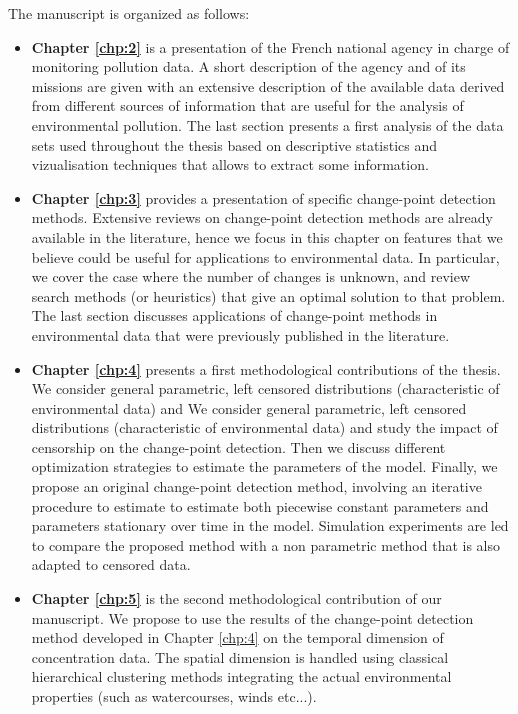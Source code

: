 The manuscript is organized as follows:
\begin{itemize}
\item{\textbf{Chapter \ref{chp:2}}} is a presentation of the French national agency in charge of monitoring pollution data. A short description of the agency and of its missions are given with an extensive description of the available data derived from different sources of information that are useful for the analysis of environmental pollution. The last section presents a first analysis of the data sets used throughout the thesis based on descriptive statistics and vizualisation techniques that allows to extract some information.
\item{\textbf{Chapter \ref{chp:3}}} provides a presentation of specific change-point detection methods. Extensive reviews on change-point detection  methods  are already  available in the literature,  hence we  focus  in this chapter on  features  that  we believe could  be  useful  for applications  to  environmental  data. In particular, we cover the case where the number of changes is unknown, and review search methods (or heuristics) that give an optimal solution to that problem. The last section discusses applications of change-point methods in environmental data that were previously published in the literature.
\item{\textbf{Chapter \ref{chp:4}}} presents a first methodological contributions of the thesis. 
We consider general parametric, left censored distributions (characteristic of environmental data) and We consider general parametric, left censored distributions (characteristic of environmental data) and study the impact of censorship on the change-point detection.  Then we discuss different optimization strategies to estimate the parameters of the model. Finally, we propose an original change-point detection method, involving an iterative procedure to estimate to estimate both piecewise constant parameters and parameters stationary over time in the model.  Simulation experiments are led to compare the proposed method with a non parametric method that is also adapted to censored data. 
\item{\textbf{Chapter \ref{chp:5}}} is the second methodological contribution of our manuscript. We propose to use the results of the change-point detection method developed in Chapter \ref{chp:4} on the temporal dimension of concentration data. The spatial dimension is handled using classical hierarchical clustering methods integrating the actual environmental properties (such as watercourses, winds etc...).

\end{itemize}
